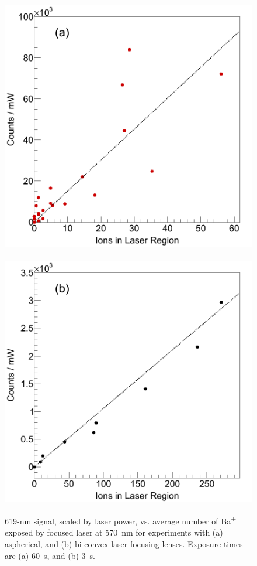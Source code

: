 
\begin{figure} %
        \centering
                \includegraphics[width=.5\textwidth]{figures/lin_just20150807_lin.png}
                ~
                \includegraphics[width=.5\textwidth]{figures/lin_just20150526_lin.png}
                \caption{619-nm signal, scaled by laser power, vs. average number of Ba\textsuperscript{+} exposed by focused laser at 570~nm for experiments with (a) aspherical, and (b) bi-convex laser focusing lenses.  Exposure times are (a) 60~s, and (b) 3~s.}
\label{fig:lin}
\end{figure}

